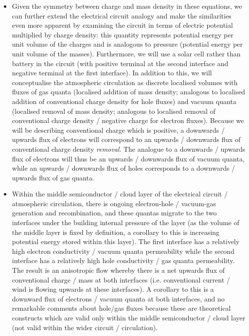 \begin{itemize}
	\item Given the symmetry between charge and mass density in these equations, we can further extend the electrical circuit analogy and make the similarities even more apparent by examining the circuit in terms of electric potential multiplied by charge density: this quantity represents potential energy per unit volume of the charges and is analogous to pressure (potential energy per unit volume of the masses). Furthermore, we will use a solar cell rather than battery in the circuit (with positive terminal at the second interface and negative terminal at the first interface). In addition to this, we will conceptualise the atmospheric circulation as discrete localised volumes with fluxes of gas quanta (localised addition of mass density; analogous to localised addition of conventional charge density for hole fluxes) and vacuum quanta (localised removal of mass density; analogous to localised removal of conventional charge density / negative charge for electron fluxes). Because we will be describing conventional charge which is positive, a downwards / upwards flux of electrons will correspond to an upwards / downwards flux of conventional charge density \textit{removal}. The analogue to a downwards / upwards flux of electrons will thus be an upwards / downwards flux of vacuum quanta, while an upwards / downwards flux of holes corresponds to a downwards / upwards flux of gas quanta.
	\item Within the middle semiconductor / cloud layer of the electrical circuit / atmospheric circulation, there is ongoing electron-hole / vacuum-gas generation and recombination, and these quantas migrate to the two interfaces under the building internal pressure of the layer (as the volume of the middle layer is fixed by definition, a corollary to this is increasing potential energy stored within this layer). The first interface has a relatively high electron conductivity / vacuum quanta permeability while the second interface has a relatively high hole conductivity / gas quanta permeability. The result is an anisotropic flow whereby there is a net upwards flux of conventional charge / mass at both interfaces (i.e. conventional current / wind is flowing upwards at these interfaces). A corollary to this is a downward flux of electrons / vacuum quanta at both interfaces, and no remarkable comments about hole/gas fluxes because these are theoretical constructs which are valid only within the middle semiconductor / cloud layer (not valid within the wider circuit / circulation).

\end{itemize}
